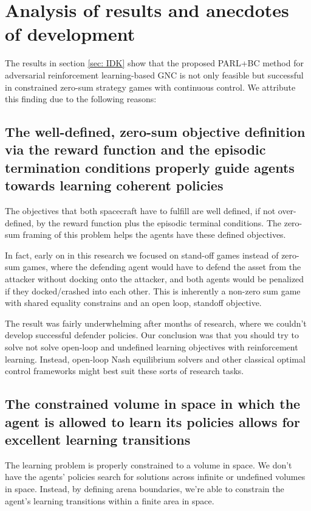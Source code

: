 \section{Analysis of results and anecdotes of development}

The results in section \ref{sec: IDK} show that the proposed PARL+BC method for adversarial reinforcement learning-based GNC is not only feasible but successful in constrained zero-sum strategy games with continuous control. We attribute this finding due to the following reasons:

\subsection*{The well-defined, zero-sum objective definition via the reward function and the episodic termination conditions properly guide agents towards learning coherent policies}

The objectives that both spacecraft have to fulfill are well defined, if not over-defined, by the reward function plus the episodic terminal conditions. The zero-sum framing of this problem helps the agents have these defined objectives.
    
In fact, early on in this research we focused on stand-off games instead of zero-sum games, where the defending agent would have to defend the asset from the attacker without docking onto the attacker, and both agents would be penalized if they docked/crashed into each other. This is inherently a non-zero sum game with shared equality constrains and an open loop, standoff objective.

The result was fairly underwhelming after months of research, where we couldn't develop successful defender policies. Our conclusion was that you should try to solve not solve open-loop and undefined learning objectives with reinforcement learning. Instead, open-loop Nash equilibrium solvers and other classical optimal control frameworks might best suit these sorts of research tasks.

\subsection*{The constrained volume in space in which the agent is allowed to learn its policies allows for excellent learning transitions}


The learning problem is properly constrained to a volume in space. We don't have the agents' policies search for solutions across infinite or undefined volumes in space. Instead, by defining arena boundaries, we're able to constrain the agent's learning transitions within a finite area in space.

